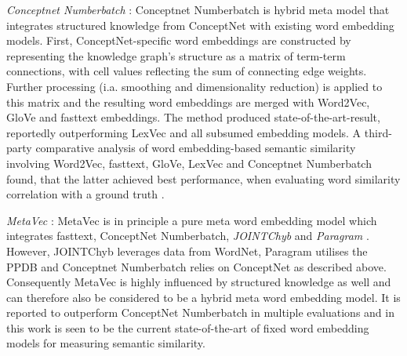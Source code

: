 \documentclass[11pt]{scrreprt}
\let\cite\parencite  %
\begin{document}

\textit{Conceptnet Numberbatch} \cite{speerConceptNetOpenMultilingual2018, speerConceptNetOpenMultilingual2017}: Conceptnet Numberbatch is hybrid meta model that integrates structured knowledge from ConceptNet with existing word embedding models. First, ConceptNet-specific word embeddings are constructed by representing the knowledge graph's structure as a matrix of term-term connections, with cell values reflecting the sum of connecting edge weights. Further processing (i.a. smoothing and dimensionality reduction) is applied to this matrix and the resulting word embeddings are merged with Word2Vec, GloVe and fasttext embeddings. The method produced state-of-the-art-result, reportedly outperforming LexVec and all subsumed embedding models. A third-party comparative analysis of word embedding-based semantic similarity involving Word2Vec, fasttext, GloVe, LexVec and Conceptnet Numberbatch found, that the latter achieved best performance, when evaluating word similarity correlation with a ground truth \cite{toshevskaComparativeAnalysisWord2020}.

\textit{MetaVec} \cite{garcia-ferreroBenchmarkingMetaembeddingsWhat2021}: MetaVec is in principle a pure meta word embedding model which integrates fasttext, ConceptNet Numberbatch, \textit{JOINTChyb} \cite{goikoetxeaBilingualEmbeddingsRandom2018a} and \textit{Paragram} \cite{wietingParaphraseDatabaseCompositional2015a}. However, JOINTChyb leverages data from WordNet, Paragram utilises the PPDB and Conceptnet Numberbatch relies on ConceptNet as described above. Consequently MetaVec is highly influenced by structured knowledge as well and can therefore also be considered to be a hybrid meta word embedding model. It is reported to outperform ConceptNet Numberbatch in multiple evaluations and in this work is seen to be the current state-of-the-art of fixed word embedding models for measuring semantic similarity.



\end{document}
